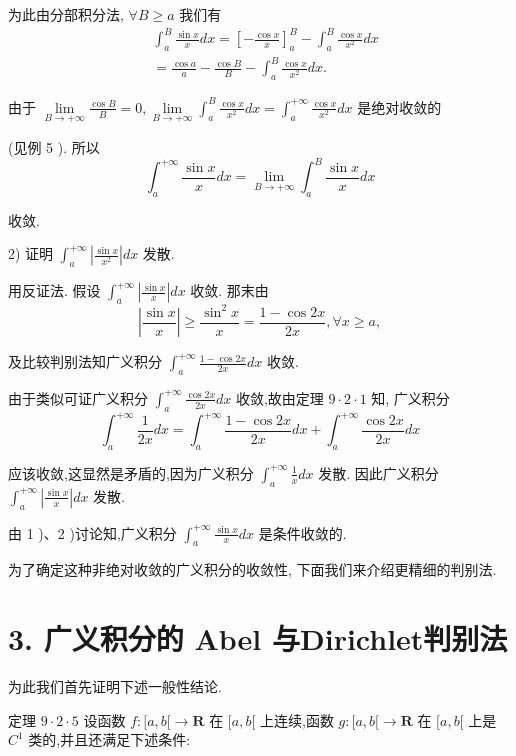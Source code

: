 为此由分部积分法, $\forall B \geq  a$ 我们有
\begin{align*}
	&{\int }_{a}^{B}\frac{\sin x}{x}{dx} = {\left\lbrack  -\frac{\cos x}{x}\right\rbrack  }_{a}^{B} - {\int }_{a}^{B}\frac{\cos x}{{x}^{2}}{dx}\\
	&= \frac{\cos a}{a} - \frac{\cos B}{B} - {\int }_{a}^{B}\frac{\cos x}{{x}^{2}}{dx}.
\end{align*}

由于 $\mathop{\lim }\limits_{{B \rightarrow   + \infty }}\frac{\cos B}{B} = 0,\mathop{\lim }\limits_{{B \rightarrow   + \infty }}{\int }_{a}^{B}\frac{\cos x}{{x}^{2}}{dx} = {\int }_{a}^{+\infty }\frac{\cos x}{{x}^{2}}{dx}$ 是绝对收敛的

(见例 5 ). 所以
$${\int }_{a}^{+\infty }\frac{\sin x}{x}{dx} = \mathop{\lim }\limits_{{B \rightarrow   + \infty }}{\int }_{a}^{B}\frac{\sin x}{x}{dx}$$

收敛.

2) 证明 ${\int }_{a}^{+\infty }\left| \frac{\sin x}{{x}^{2}}\right| {dx}$ 发散.

用反证法. 假设 ${\int }_{a}^{+\infty }\left| \frac{\sin x}{x}\right| {dx}$ 收敛. 那末由
$$\left| \frac{\sin x}{x}\right|  \geq  \frac{{\sin }^{2}x}{x} = \frac{1 - \cos {2x}}{2x},\forall x \geq  a,$$

及比较判别法知广义积分 ${\int }_{a}^{+\infty }\frac{1 - \cos {2x}}{2x}{dx}$ 收敛.

由于类似可证广义积分 ${\int }_{a}^{+\infty }\frac{\cos {2x}}{2x}{dx}$ 收敛,故由定理 $9 \cdot  2 \cdot  1$ 知, 广义积分
$${\int }_{a}^{+\infty }\frac{1}{2x}{dx} = {\int }_{a}^{+\infty }\frac{1 - \cos {2x}}{2x}{dx} + {\int }_{a}^{+\infty }\frac{\cos {2x}}{2x}{dx}$$

应该收敛,这显然是矛盾的,因为广义积分 ${\int }_{a}^{+\infty }\frac{1}{x}{dx}$ 发散. 因此广义积分 ${\int }_{a}^{+\infty }\left| \frac{\sin x}{x}\right| {dx}$ 发散.

由 1 )、2 )讨论知,广义积分 ${\int }_{a}^{+\infty }\frac{\sin x}{x}{dx}$ 是条件收敛的.

为了确定这种非绝对收敛的广义积分的收敛性, 下面我们来介绍更精细的判别法.

\section*{3. 广义积分的 Abel 与Dirichlet判别法}

为此我们首先证明下述一般性结论.

定理 $9 \cdot  2 \cdot  5$ 设函数 $f : \lbrack a,b\lbrack  \rightarrow  \mathbf{R}$ 在 $\lbrack a,b\lbrack$ 上连续,函数 $g : \lbrack a,b\lbrack  \rightarrow  \mathbf{R}$ 在 $\lbrack a,b\lbrack$ 上是 ${C}^{1}$ 类的,并且还满足下述条件:

